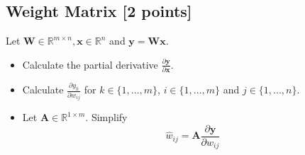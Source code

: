 \taskbreak

\subsection{Weight Matrix [2 points]}
Let $\mathbf{W} \in \mathds{R}^{m \times n}, \mathbf{x} \in \mathds{R}^{n}$ and $\mathbf{y} = \mathbf{Wx}$.
\begin{itemize}
    \item[a)] Calculate the partial derivative $\frac{\partial \mathbf{y}}{\partial \mathbf{x}}$.
        
    \subtaskbreak
    
    \item[b)] Calculate $\frac{\partial y_k}{\partial w_{ij}}$ for $k \in \{1, ..., m\}$, $i \in \{1, ..., m\}$ and $j \in \{1, ..., n\}$.
    
    \subtaskbreak
    
    \item[c)] Let $\mathbf{A} \in \mathds{R}^{1 \times m}$. Simplify
        \begin{equation}
            \widehat{w}_{ij} = \mathbf{A} \frac{\partial \mathbf{y}}{\partial w_{ij}}
        \end{equation}
        
\end{itemize}
